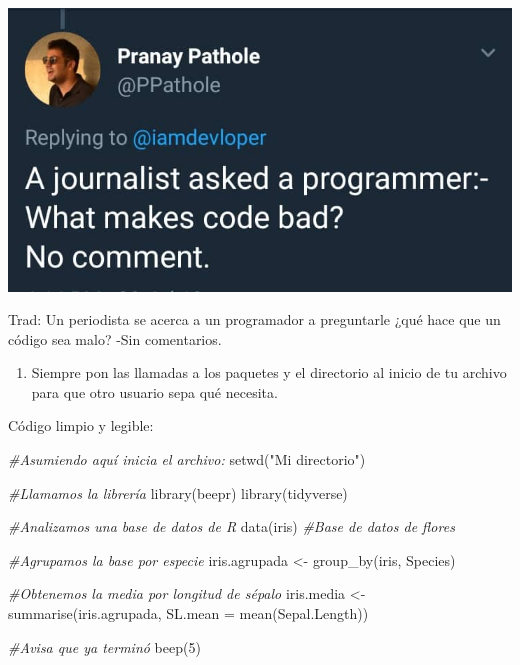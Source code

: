 \documentclass[]{tufte-book}
\newenvironment{Shaded}{}{}
\newcommand{\AttributeTok}[1]{\textcolor[rgb]{0.49,0.56,0.16}{#1}}
\newcommand{\CommentTok}[1]{\textcolor[rgb]{0.38,0.63,0.69}{\textit{#1}}}
\newcommand{\DecValTok}[1]{\textcolor[rgb]{0.25,0.63,0.44}{#1}}
\newcommand{\FunctionTok}[1]{\textcolor[rgb]{0.02,0.16,0.49}{#1}}
\newcommand{\NormalTok}[1]{#1}
\newcommand{\OtherTok}[1]{\textcolor[rgb]{0.00,0.44,0.13}{#1}}
\newcommand{\StringTok}[1]{\textcolor[rgb]{0.25,0.44,0.63}{#1}}
\providecommand{\tightlist}{%
  \setlength{\itemsep}{0pt}\setlength{\parskip}{0pt}}
\begin{document}
\begin{marginfigure}
\includegraphics[width=10in]{images/tweet1} \caption[Trad]{Trad: Un periodista se acerca a un programador a preguntarle ¿qué hace que un código sea malo? -Sin comentarios.}\label{fig:unnamed-chunk-96}
\end{marginfigure}

\begin{enumerate}
\def\labelenumi{\arabic{enumi}.}
\setcounter{enumi}{6}
\tightlist
\item
  Siempre pon las llamadas a los paquetes y el directorio al inicio de
  tu archivo para que otro usuario sepa qué necesita.
\end{enumerate}

Código limpio y legible:

\begin{Shaded}
\begin{Highlighting}[]
\CommentTok{\#Asumiendo aquí inicia el archivo:}
\FunctionTok{setwd}\NormalTok{(}\StringTok{"Mi directorio"}\NormalTok{)}

\CommentTok{\#Llamamos la librería}
\FunctionTok{library}\NormalTok{(beepr)}
\FunctionTok{library}\NormalTok{(tidyverse)}

\CommentTok{\#Analizamos una base de datos de R}
\FunctionTok{data}\NormalTok{(iris) }\CommentTok{\#Base de datos de flores}

\CommentTok{\#Agrupamos la base por especie}
\NormalTok{iris.agrupada }\OtherTok{\textless{}{-}} \FunctionTok{group\_by}\NormalTok{(iris, Species)}

\CommentTok{\#Obtenemos la media por longitud de sépalo}
\NormalTok{iris.media    }\OtherTok{\textless{}{-}} \FunctionTok{summarise}\NormalTok{(iris.agrupada, }\AttributeTok{SL.mean =} \FunctionTok{mean}\NormalTok{(Sepal.Length))}

\CommentTok{\#Avisa que ya terminó}
\FunctionTok{beep}\NormalTok{(}\DecValTok{5}\NormalTok{)}
\end{Highlighting}
\end{Shaded}
\end{document}

